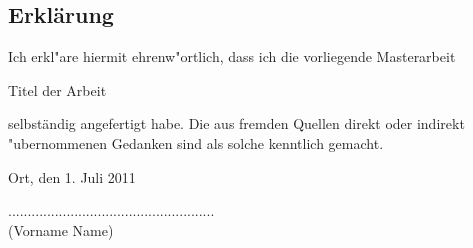 \begin{center}
\section*{Erkl\"{a}rung}
\end{center}

\vspace{2cm}
\begin{flushleft}
Ich erkl"are hiermit ehrenw"ortlich, dass ich die vorliegende Masterarbeit\\[-0.3cm]
\end{flushleft}
\begin{center}
{\large Titel der Arbeit}\\[0.5cm]
\end{center}
selbst\"{a}ndig angefertigt habe. Die aus fremden Quellen direkt oder indirekt
"ubernommenen Gedanken sind als solche kenntlich gemacht.\\[2.5cm]

\begin{flushleft}
Ort, den 1. Juli 2011\\[0.1cm]
\end{flushleft}
\hspace*{9.0cm}.....................................................\\
\hspace*{10.1cm}(Vorname Name)
